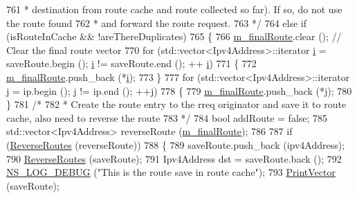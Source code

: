 \begin{DoxyCode}
761 \textcolor{comment}{       *      destination from route cache and route collected so far). If so, do not use the route found}
762 \textcolor{comment}{       *      and forward the route request.}
763 \textcolor{comment}{       */}
764       \textcolor{keywordflow}{else} \textcolor{keywordflow}{if} (isRouteInCache && !areThereDuplicates)
765         \{
766               \hyperlink{classns3_1_1dsr_1_1DsrOptions_a3fe6a72ebaae73724ce63383635b7af8}{m\_finalRoute}.clear ();            \textcolor{comment}{// Clear the final route vector}
770 \textcolor{comment}{}              \textcolor{keywordflow}{for} (std::vector<Ipv4Address>::iterator \hyperlink{bernuolliDistribution_8m_a6f6ccfcf58b31cb6412107d9d5281426}{i} = saveRoute.begin (); \hyperlink{bernuolliDistribution_8m_a6f6ccfcf58b31cb6412107d9d5281426}{i} != saveRoute.end (); ++
      \hyperlink{bernuolliDistribution_8m_a6f6ccfcf58b31cb6412107d9d5281426}{i})
771                 \{
772                   \hyperlink{classns3_1_1dsr_1_1DsrOptions_a3fe6a72ebaae73724ce63383635b7af8}{m\_finalRoute}.push\_back (*\hyperlink{bernuolliDistribution_8m_a6f6ccfcf58b31cb6412107d9d5281426}{i});
773                 \}
777               \textcolor{keywordflow}{for} (std::vector<Ipv4Address>::iterator j = ip.begin (); j != ip.end (); ++j)
778                 \{
779                   \hyperlink{classns3_1_1dsr_1_1DsrOptions_a3fe6a72ebaae73724ce63383635b7af8}{m\_finalRoute}.push\_back (*j);
780                 \}
781               \textcolor{comment}{/*}
782 \textcolor{comment}{               * Create the route entry to the rreq originator and save it to route cache, also need to
       reverse the route}
783 \textcolor{comment}{               */}
784               \textcolor{keywordtype}{bool} addRoute = \textcolor{keyword}{false};
785               std::vector<Ipv4Address> reverseRoute (\hyperlink{classns3_1_1dsr_1_1DsrOptions_a3fe6a72ebaae73724ce63383635b7af8}{m\_finalRoute});
786 
787               \textcolor{keywordflow}{if} (\hyperlink{classns3_1_1dsr_1_1DsrOptions_a49547f030b51a51499c36f9b5802ec3c}{ReverseRoutes} (reverseRoute))
788                 \{
789                   saveRoute.push\_back (ipv4Address);
790                   \hyperlink{classns3_1_1dsr_1_1DsrOptions_a49547f030b51a51499c36f9b5802ec3c}{ReverseRoutes} (saveRoute);
791                   Ipv4Address dst = saveRoute.back ();
792                   \hyperlink{group__logging_ga413f1886406d49f59a6a0a89b77b4d0a}{NS\_LOG\_DEBUG} (\textcolor{stringliteral}{"This is the route save in route cache"});
793                   \hyperlink{classns3_1_1dsr_1_1DsrOptions_a44ae8e58769880ec9c0150bb28652350}{PrintVector} (saveRoute);

\end{DoxyCode}
